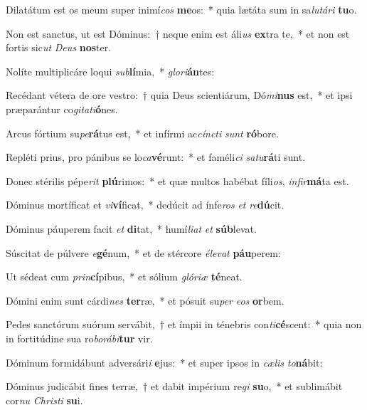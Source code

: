 \item Dilatátum est os meum super inimí\textit{cos} \textbf{me}os:~* quia lætáta sum in sa\textit{lu}\textit{tá}\textit{ri} \textbf{tu}o.
\item Non est sanctus, ut est Dóminus:~† neque enim est áli\textit{us} \textbf{ex}tra te,~* et non est fortis sic\textit{ut} \textit{De}\textit{us} \textbf{nos}ter.
\item Nolíte multiplicáre loqui \textit{sub}\textbf{lí}mia,~* \textit{glo}\textit{ri}\textbf{án}tes:
\item Recédant vétera de ore vestro:~† quia Deus scientiárum, Dó\textit{mi}\textbf{nus} est,~* et ipsi præparántur co\textit{gi}\textit{ta}\textit{ti}\textbf{ó}nes.
\item Arcus fórtium su\textit{pe}\textbf{rá}tus est,~* et infírmi ac\textit{cínc}\textit{ti} \textit{sunt} \textbf{ró}bore.
\item Repléti prius, pro pánibus se lo\textit{ca}\textbf{vé}runt:~* et faméli\textit{ci} \textit{sa}\textit{tu}\textbf{rá}ti sunt.
\item Donec stérilis pépe\textit{rit} \textbf{plú}rimos:~* et quæ multos habébat fíli\textit{os}, \textit{in}\textit{fir}\textbf{má}ta est.
\item Dóminus mortíficat et \textit{vi}\textbf{ví}ficat,~* dedúcit ad ínfe\textit{ros} \textit{et} \textit{re}\textbf{dú}cit.
\item Dóminus páuperem facit \textit{et} \textbf{di}tat,~* humí\textit{li}\textit{at} \textit{et} \textbf{súb}levat.
\item Súscitat de púlvere \textit{e}\textbf{gé}num,~* et de stércore \textit{é}\textit{le}\textit{vat} \textbf{páu}perem:
\item Ut sédeat cum \textit{prin}\textbf{cí}pibus,~* et sólium \textit{gló}\textit{ri}\textit{æ} \textbf{té}neat.
\item Dómini enim sunt cárdi\textit{nes} \textbf{ter}ræ,~* et pósuit su\textit{per} \textit{e}\textit{os} \textbf{or}bem.
\item Pedes sanctórum suórum servábit,~† et ímpii in ténebris con\textit{ti}\textbf{cé}scent:~* quia non in fortitúdine sua ro\textit{bo}\textit{rá}\textit{bi}\textbf{tur} vir.
\item Dóminum formidábunt adversári\textit{i} \textbf{e}jus:~* et super ipsos in \textit{cæ}\textit{lis} \textit{to}\textbf{ná}bit:
\item Dóminus judicábit fines terræ,~† et dabit impérium re\textit{gi} \textbf{su}o,~* et sublimábit cor\textit{nu} \textit{Chris}\textit{ti} \textbf{su}i.
